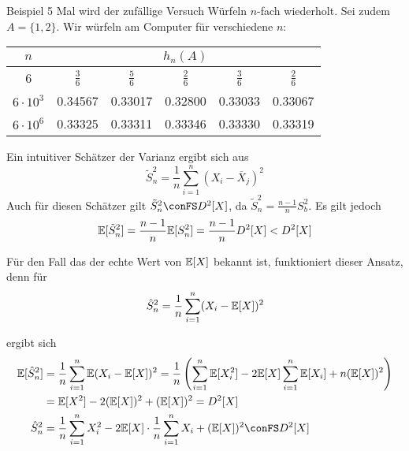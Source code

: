 \begin{colbox}{Beispiel}
    5 Mal wird der zufällige Versuch Würfeln $n$-fach wiederholt. Sei zudem $A = \{1,2\}$. 
    Wir würfeln am Computer für verschiedene $n$:
\begin{table}[ht]
  \centering
  \begin{tabular}{c|ccccc}
    \toprule
    \(n\) & \multicolumn{5}{c}{\(h_n(A)\)} \\
    \midrule
    6             & \(\tfrac{3}{6}\)   & \(\tfrac{5}{6}\)   & \(\tfrac{2}{6}\)   & \(\tfrac{3}{6}\)   & \(\tfrac{2}{6}\)   \\
    \(6\cdot10^3\) & 0.34567            & 0.33017            & 0.32800            & 0.33033            & 0.33067            \\
    \(6\cdot10^6\) & 0.33325            & 0.33311            & 0.33346            & 0.33330            & 0.33319            \\
    \bottomrule
  \end{tabular}
\end{table}
\end{colbox}

Ein intuitiver Schätzer der Varianz ergibt sich aus
\[
    \tilde{S}_n^2 = \dfrac{1}{n} \sum_{i=1}^{n} (X_i - \overline{X}_j)^2
\]
Auch für diesen Schätzer gilt $\tilde{S}_n^2 \conFS D^2[X]$, da $\tilde{S}_n^2=\tfrac{n-1}{n}S_b^2$. Es gilt jedoch 
\[
    \mathbb E[\tilde{S}_n^2] = \dfrac{n-1}{n}\mathbb E[S_n^2] = \dfrac{n-1}{n}D^2[X] < D^2[X]
\]

Für den Fall das der echte Wert von $\mathbb E[X]$ bekannt ist, funktioniert dieser Ansatz, denn für 
\[
    \hat{S}_n^2 = \dfrac{1}{n} \sum_{i=1}^{n} (X_i - \mathbb E[X])^2
\]

ergibt sich 
\begin{align*}
    \E[\hat{S}_n^2] 
    &= \dfrac{1}{n} \sum_{i=1}^{n} \E(X_i - \E[X])^2 
    = \dfrac{1}{n} \left(\sum_{i=1}^{n} \E[X_i^2] - 2\E[X]\sum_{i=1}^{n} \E[X_i] + n(\E[X])^2 \right) \\
    &= \E[X^2] - 2(\E[X])^2 + (\E[X])^2 
    = D^2[X] \\
    \hat{S}_n^2 &= \dfrac{1}{n}\sum_{i=1}^{n}X_i^2 - 2\E[X]\cdot\dfrac{1}{n}\sum_{i=1}^{n}X_i + (\E[X])^2 \conFS D^2[X]
\end{align*}

